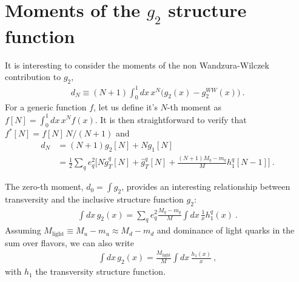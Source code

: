 \documentclass[preprintnumbers,floatfix,nofootinbib]{revtex4}
\newcommand{\mj}{M_q}
\newcommand{\mq}{m_q}
\begin{document}
\section{Moments of the $g_2$ structure function}
\label{sec:moments}

It is interesting to consider the moments of the non Wandzura-Wilczek contribution to $g_2$,
\begin{align}
  d_N \equiv (N+1) \int_0^1 dx\,x^N \bigg( g_2(x) - g_2^{WW}(x) \bigg) \ .
\end{align}
For a generic function $f$, let us define it's $N$-th moment as $f[N]=\int_0^1 dx\, x^{N} f(x)$. It is then straightforward to verify that $f^*[N] = f[N]\,N/(N+1)$ and  
\begin{align}
  d_N & = (N+1) g_2[N] + N g_1[N] \\
  & = \frac12 \sum_q e_q^2 \bigg[ N \tilde g_T^q[N] + \hat g_T^q[N]  
    + \frac{(N+1) \mj- \mq}{M} h_1^q[N-1] \bigg] \ .
\end{align}

The zero-th moment, $d_0=\int g_2$, provides an interesting relationship between transversity and the inclusive structure function $g_2$:
\begin{align}
  \label{eq:BC}
  \int dx\, g_2(x) = \sum_q e_q^2 \frac{\mj-\mq}{M} \int dx\, \frac{1}{x} h_1^q(x) \ .
\end{align}
Assuming $M_\text{light}\equiv M_u -m_u \approx M_d -m_d$ and dominance of light quarks in the sum over flavors, we can also write
\begin{align}
  \label{eq:BC-sfn}
  \int dx\, g_2(x) = \frac{M_\text{light}}{M} \int dx\, \frac{h_1(x)}{x} \ ,
\end{align}
with $h_1$ the transversity structure function.
\end{document}
